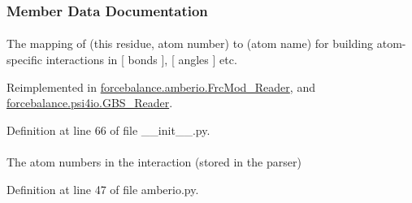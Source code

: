 \subsubsection{\-Member \-Data \-Documentation}
\hypertarget{classforcebalance_1_1BaseReader_a2c46ad6b66cf09a30e917ce4a1997e2a}{
\paragraph[{adict}]{}}\label{classforcebalance_1_1BaseReader_a2c46ad6b66cf09a30e917ce4a1997e2a}


\-The mapping of (this residue, atom number) to (atom name) for building atom-\/specific interactions in \mbox{[} bonds \mbox{]}, \mbox{[} angles \mbox{]} etc. 



\-Reimplemented in \hyperlink{classforcebalance_1_1amberio_1_1FrcMod__Reader_ae3b36131778cad32336f88fdb6d724ee}{forcebalance.\-amberio.\-Frc\-Mod\-\_\-\-Reader}, and \hyperlink{classforcebalance_1_1psi4io_1_1GBS__Reader_aa7cbae977f7e9a4e14ba1d45f62bb5fa}{forcebalance.\-psi4io.\-G\-B\-S\-\_\-\-Reader}.



\-Definition at line 66 of file \-\_\-\-\_\-init\-\_\-\-\_\-.\-py.

\hypertarget{classforcebalance_1_1amberio_1_1Mol2__Reader_ac6144080884f44ad7992e3045cb7a6fd}{
\paragraph[{atom}]{}}\label{classforcebalance_1_1amberio_1_1Mol2__Reader_ac6144080884f44ad7992e3045cb7a6fd}


\-The atom numbers in the interaction (stored in the parser) 



\-Definition at line 47 of file amberio.\-py.

